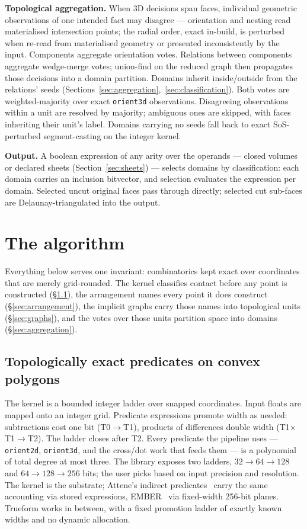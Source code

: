 \documentclass{egpubl}
\begin{document}
\textbf{Topological aggregation.} When 3D decisions span faces, individual geometric observations of one intended fact may disagree --- orientation and nesting read materialised intersection points; the radial order, exact in-build, is perturbed when re-read from materialised geometry or presented inconsistently by the input. Components aggregate orientation votes. Relations between components aggregate wedge-merge votes; union-find on the reduced graph then propagates those decisions into a domain partition. Domains inherit inside/outside from the relations' seeds (Sections~\ref{sec:aggregation},~\ref{sec:classification}). Both votes are weighted-majority over exact \texttt{orient3d} observations. Disagreeing observations within a unit are resolved by majority; ambiguous ones are skipped, with faces inheriting their unit's label. Domains carrying no seeds fall back to exact SoS-perturbed segment-casting on the integer kernel.

\textbf{Output.} A boolean expression of any arity over the operands --- closed volumes or declared sheets (Section~\ref{sec:sheets}) --- selects domains by classification: each domain carries an inclusion bitvector, and selection evaluates the expression per domain. Selected uncut original faces pass through directly; selected cut sub-faces are Delaunay-triangulated into the output.


\section{The algorithm}
\label{sec:algorithm}

Everything below serves one invariant: combinatorics kept exact over coordinates that are merely grid-rounded. The kernel classifies contact before any point is constructed (\S\ref{sec:predicates}), the arrangement names every point it does construct (\S\ref{sec:arrangement}), the implicit graphs carry those names into topological units (\S\ref{sec:graphs}), and the votes over those units partition space into domains (\S\ref{sec:aggregation}).

\subsection{Topologically exact predicates on convex polygons}
\label{sec:predicates}

The kernel is a bounded integer ladder over snapped coordinates. Input floats are mapped onto an integer grid. Predicate expressions promote width as needed: subtractions cost one bit (T0$\to$T1), products of differences double width (T1$\times$T1$\to$T2). The ladder closes after T2. Every predicate the pipeline uses --- \texttt{orient2d}, \texttt{orient3d}, and the cross/dot work that feeds them --- is a polynomial of total degree at most three. The library exposes two ladders, $32{\to}64{\to}128$ and $64{\to}128{\to}256$ bits; the user picks based on input precision and resolution. The kernel is the substrate; Attene's indirect predicates~\cite{Attene2020} carry the same accounting via stored expressions, EMBER~\cite{Trettner2022} via fixed-width 256-bit planes. Trueform works in between, with a fixed promotion ladder of exactly known widths and no dynamic allocation.
\end{document}
